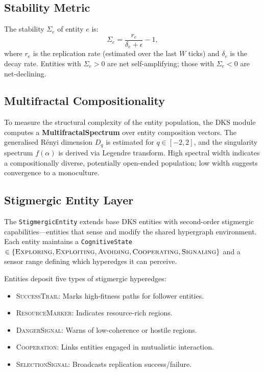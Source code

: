 \documentclass[11pt]{article}
\begin{document}
\subsection{Stability Metric}

The stability $\Sigma_e$ of entity $e$ is:
\begin{equation}
  \Sigma_e = \frac{r_e}{\delta_e + \epsilon} - 1,
  \label{eq:dks_stability}
\end{equation}
where $r_e$ is the replication rate (estimated over the last $W$ ticks) and
$\delta_e$ is the decay rate. Entities with $\Sigma_e > 0$ are net self-amplifying;
those with $\Sigma_e < 0$ are net-declining.

\subsection{Multifractal Compositionality}

To measure the structural complexity of the entity population, the DKS module
computes a \textbf{MultifractalSpectrum} over entity composition vectors. The
generalised R\'enyi dimension $D_q$ is estimated for $q \in [-2, 2]$, and the
singularity spectrum $f(\alpha)$ is derived via Legendre transform. High spectral
width indicates a compositionally diverse, potentially open-ended population; low
width suggests convergence to a monoculture.

\subsection{Stigmergic Entity Layer}

The \texttt{StigmergicEntity} extends base DKS entities with second-order
stigmergic capabilities---entities that sense and modify the shared hypergraph
environment. Each entity maintains a \texttt{CognitiveState} $\in \{\textsc{Exploring},
\textsc{Exploiting}, \textsc{Avoiding}, \textsc{Cooperating}, \textsc{Signaling}\}$
and a sensor range defining which hyperedges it can perceive.

Entities deposit five types of stigmergic hyperedges:
\begin{itemize}[noitemsep,topsep=4pt]
  \item \textsc{SuccessTrail}: Marks high-fitness paths for follower entities.
  \item \textsc{ResourceMarker}: Indicates resource-rich regions.
  \item \textsc{DangerSignal}: Warns of low-coherence or hostile regions.
  \item \textsc{Cooperation}: Links entities engaged in mutualistic interaction.
  \item \textsc{SelectionSignal}: Broadcasts replication success/failure.
\end{itemize}
\end{document}
